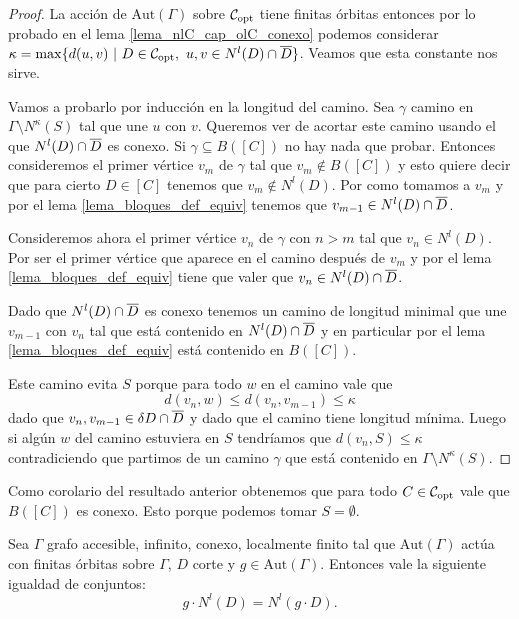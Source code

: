 \documentclass[tesis.tex]{subfiles}
\newcommand{\aut}{\text{Aut}}
\begin{document}
\begin{proof}
	La acción de $\aut(\Gamma)$ sobre ${\cal C}_{\text{opt}}$ tiene finitas órbitas entonces por lo probado en el lema \ref{lema_nlC_cap_olC_conexo} podemos considerar 
	$\kappa = \max \{ d(u,v) \ | \ D \in \copt, \  u,v \in N^l(D) \cap \ol D  \}$. 	
	Veamos que esta constante nos sirve.
	
	Vamos a probarlo por inducción en la longitud del camino.
	Sea $\gamma$ camino en $\Gamma \setminus N^{\kappa}(S)$ tal que une $u$ con $v$.
	Queremos ver de acortar este camino usando el  que $N^{l}(D) \cap \overline D$ es conexo.
	Si $\gamma \subseteq B([C])$ no hay nada que probar.
	Entonces consideremos el primer vértice $v_m$ de $\gamma$ tal que $v_m \notin B([C])$ y esto quiere decir que para cierto $D \in [C]$ tenemos que $v_m \notin N^l(D)$.
	Por como tomamos a $v_{m}$ y por el lema \ref{lema_bloques_def_equiv} tenemos que $v_{m-1} \in N^l(D) \cap \overline D$.
	
		
	Consideremos ahora el primer vértice $v_n$ de $\gamma$ con $n > m$ tal que $v_n \in N^l(D)$.
	Por ser el primer vértice que aparece en el camino después de $v_{m}$ y por el lema \ref{lema_bloques_def_equiv} tiene que valer que $v_n \in N^l(D) \cap \overline D$.
	
	Dado que $N^l(D) \cap \overline D$ es conexo tenemos un camino de longitud minimal que une $v_{m-1}$ con $v_n$ tal que está contenido en $N^l(D) \cap \overline D$ y en particular por el lema \ref{lema_bloques_def_equiv} está contenido en $B([C])$.
	
	Este camino evita $S$ porque para todo $w$ en el camino vale que 
	\[
		d(v_{n},w) \le d(v_{n},v_{m-1}) \le \kappa
	\]
	dado que $v_{n}, v_{m-1} \in \delta D \cap \overline D$ y dado que el camino tiene longitud mínima.
	Luego si algún $w$ del camino estuviera en $S$ tendríamos que 
	$d(v_n,S) \le \kappa$ contradiciendo que partimos de un camino $\gamma$ que está contenido en $\Gamma \setminus N^{\kappa}(S)$.	
	
\end{proof}


\begin{obs}
	Como corolario del resultado anterior obtenemos que para todo $C \in {\cal C}_{\text{opt}}$ vale que $B([C])$ es conexo.
	Esto porque podemos tomar $S = \emptyset$.
\end{obs}

\begin{lema}\label{lema_accion_vecinos}
	Sea $\Gamma$ grafo accesible, infinito, conexo, localmente finito tal que $\aut(\Gamma)$ actúa con finitas órbitas sobre $\Gamma$, $D$ corte y $g \in \aut(\Gamma)$. 
	Entonces vale la siguiente igualdad de conjuntos:
	\[
		g \cdot N^l(D) = N^l(g \cdot D).
	\]
\end{lema}
\end{document}
